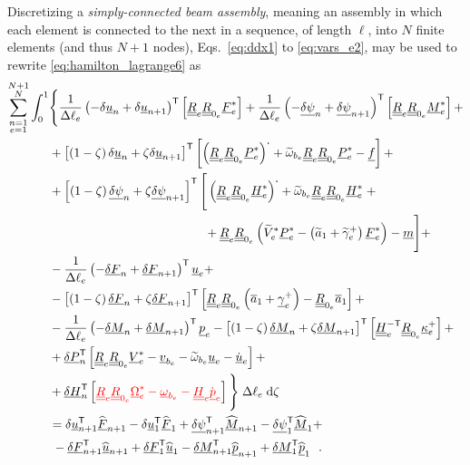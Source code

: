 \documentclass[12pt,a4paper,oneside,english]{abntex2} %
\newcommand{\fix}[1]{{\color{red}#1}}
\newcommand{\vect}[1]{\underline{#1}}
\newcommand{\uvec}[1]{\overline{#1}}
\def\tens#1{\underline{\underline{#1}}}
\def\til#1{\widetilde{#1}}
\def\lb{\left[}
\def\rb{\right]}
\def\lp{\left(}
\def\rp{\right)}
\def\T{\mathsf{T}}
\def\aone{\uvec{a}_1}
\def\aonetil{\til{a}_1}
\def\dotout{^{\boldsymbol{\cdot}}}
\def\R{\tens{R}}
\def\u{\vect{u}}
\def\udot{\dot{\u}}
\def\uhat{\widehat{\u}}
\def\gam{\vect{\gamma}}
\def\gamp{\gam^{+}}
\def\kap{\vect{\kappa}}
\def\kapp{\kap^{+}}
\def\V{\vect{V}}
\def\Vs{\V^{*}}
\def\Om{\vect{\Omega}}
\def\Oms{\Om^{*}}
\def\P{\vect{P}}
\def\Ps{\P^*}
\def\Hv{\vect{H}}
\def\Hvs{\Hv^*}
\def\H{\tens{H}}
\def\p{\vect{p}}
\def\pdot{\dot{\p}}
\def\phat{\widehat{\p}}
\def\F{\vect{F}}
\def\Fhat{\widehat{\F}}
\def\Fs{\F^*}
\def\M{\vect{M}}
\def\Mhat{\widehat{\M}}
\def\Ms{\M^*}
\def\f{\vect{f}}
\def\m{\vect{m}}
\def\delF{\vect{\delta F}}
\def\delM{\vect{\delta M}}
\def\delP{\vect{\delta P}}
\def\delH{\vect{\delta H}}
\def\delpsi{\vect{\delta\psi}}
\def\Deltal{\Delta \ell_e}
\def\Deltalinv{\frac{1}{\Deltal}}
\def\d{\textnormal{d}}
\def\vbe{\vect{v}_{b_e}}
\def\ombe{\vect{\omega}_{b_e}}
\def\omtilbe{\til{\omega}_{b_e}}
\def\ue{\u_e}
\def\udote{\udot_e}
\def\pe{\p_e}
\def\pdote{\pdot_e}
\def\Vse{\Vs_e}
\def\Vtilse{\til{V}^*_{e}}
\def\Omse{\Oms_e}
\def\gampe{\gamp_e}
\def\kappe{\kapp_e}
\def\gamptile{\til{\gamma}^{+}_e}
\def\Fse{\Fs_e}
\def\Mse{\Ms_e}
\def\Pse{\Ps_e}
\def\Hse{\Hvs_e}
\def\He{\H_e}
\def\HinvTe{\H^{-\T}_e}
\def\Re{\R_{e}}
\def\Rze{\R_{0_e}}
\begin{document}
Discretizing a \textit{simply-connected beam assembly}, meaning an assembly in which each element is connected to the next in a sequence, of length $\ell$, into $N$ finite elements (and thus $N+1$ nodes),  Eqs.~\eqref{eq:ddx1} to \eqref{eq:vars_e2}, may be used to rewrite \cref{eq:hamilton_lagrange6} as
\begin{align}
    \sum_{\substack{n=1\\e=1}}^{\substack{N+1\\N}}
    \int_0^1 &\Biggl\{\Biggr. \Deltalinv\lp-\delta\u_n+\delta\u_{n+1}\rp^\T\lb\Re\Rze\Fse\rb + \Deltalinv\lp-\delpsi_n+\delpsi_{n+1}\rp^\T \lb\Re\Rze\Mse\rb + 
    \nonumber \\ 
    &+ \lb\lp1-\zeta\rp\delta\u_{n} + \zeta\delta\u_{n+1}\rb^\T\lb\lp\Re\Rze\Pse\rp\dotout+\omtilbe\Re\Rze\Pse-\f\rb +
    \nonumber \\
	&+\lb\lp1-\zeta\rp\delpsi_{n} +        \zeta\delpsi_{n+1}\rb^\T 
	\Biggl[\Bigg.\lp\Re\Rze\Hse\rp\dotout+\omtilbe\Re\Rze\Hse \;+ 
    \nonumber \\
	&\hphantom{+\lb\lp1-\zeta\rp\delpsi_{n} +        \zeta\delpsi_{n+1}\rb^\T\;\;\;} +\Re\Rze\lp\Vtilse\Pse-\lp\aonetil+\gamptile\rp\Fse\rp-\m\Bigg.\Biggr] + 
	\nonumber \\
	&-\Deltalinv\lp-\delF_n+\delF_{n+1}\rp^\T\ue + 
    \nonumber \\
	&-\lb\lp1-\zeta\rp\delF_{n} +            \zeta\delF_{n+1}\rb^\T \lb\Re\Rze\lp\aone+\gampe\rp-\Rze\aone\rb +
	\nonumber \\
	&-\Deltalinv\lp-\delM_n+\delM_{n+1}\rp^\T\pe - \lb\lp1-\zeta\rp\delM_{n} +   \zeta\delM_{n+1}\rb^\T\lb\HinvTe\Rze\kappe\rb +
	\nonumber \\
	&+\delP_{n}^\T \lb\Re\Rze\Vse-\vbe-\omtilbe\ue-\udote\rb + 
    \nonumber \\
	&+\delH_{n}^\T\lb\fix{\Re\Rze\Omse-\ombe-\He\pdote}\rb
	\Biggl.\Biggr\}\;\Deltal\;\d\zeta \nonumber \\
	&=\delta\u_{n+1}^\T\Fhat_{n+1} - \delta\u_{1}^\T\Fhat_{1} + \delpsi_{n+1}^\T\Mhat_{n+1} - \delpsi_{1}^\T\Mhat_{1} +
	\nonumber \\
	&\;-\delF_{n+1}^\T\uhat_{n+1} + 
	\delF_{1}^\T\uhat_{1} -
	\delM_{n+1}^\T\phat_{n+1} +
	\delM_{1}^\T\phat_{1} \ \ .
    \label{eq:motion_discretized}
\end{align}
\end{document}
